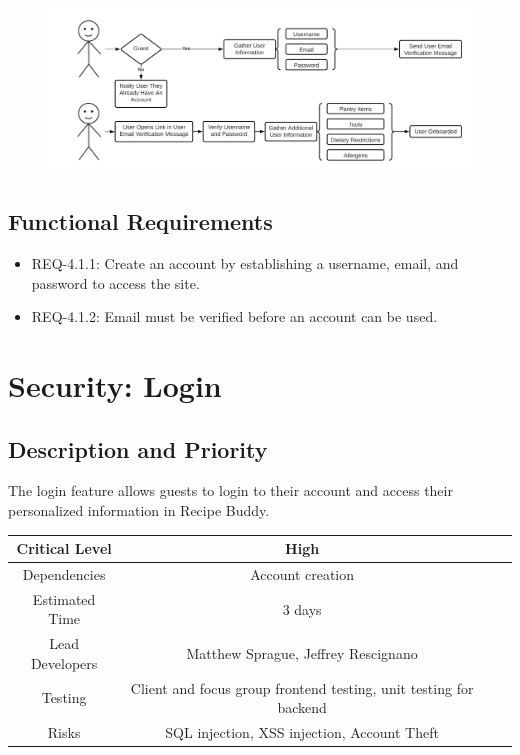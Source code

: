 \documentclass{scrreprt}
\begin{document}
\begin{figure}[H]\centering
    \includegraphics[width=\columnwidth]{FlowCharts/Security-Account-Creation.png}
\end{figure}

\subsection{Functional Requirements}

\begin{itemize}
    \item REQ-4.1.1: Create an account by establishing a username, email, and password to access the site.
    \item REQ-4.1.2: Email must be verified before an account can be used.
\end{itemize}

\section{Security: Login}

\subsection{Description and Priority}

The login feature allows guests to login to their account and access their personalized information in Recipe Buddy.

\begin{center}
    \begin{tabular}{| c | c | c | c |}
        \hline
        Critical Level  & High                                                              \\
        \hline
        Dependencies    & Account creation                                                  \\
        \hline
        Estimated Time  & 3 days                                                            \\
        \hline
        Lead Developers & Matthew Sprague, Jeffrey Rescignano                               \\
        \hline
        Testing         & Client and focus group frontend testing, unit testing for backend \\
        \hline
        Risks           & SQL injection, XSS injection, Account Theft                       \\
        \hline
    \end{tabular}
\end{center}
\end{document}
